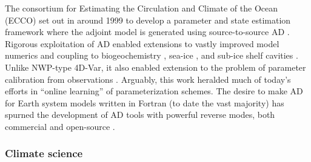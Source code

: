 The consortium for Estimating the Circulation and Climate of the Ocean (ECCO) \cite{Stammer.2002} set out in around 1999 to develop a parameter and state estimation framework
where the adjoint model is generated using source-to-source AD \cite{Marotzke:1999, Heimbach.2005}. 
Rigorous exploitation of AD enabled extensions to vastly improved model numerics \cite{Forget.2015m9i} and coupling to biogeochemistry \cite{Dutkiewicz:2006gw}, sea-ice \cite{Heimbach:2010fz}, and sub-ice shelf cavities \cite{Heimbach:2012iu,Goldberg:2020dl}.
Unlike NWP-type 4D-Var, it also enabled extension to the problem of parameter calibration from observations \cite{Ferreira.2005,Stammer:2005dw,Liu:2012jd}. 
Arguably, this work heralded much of today's efforts in ``online learning'' of parameterization schemes.
The desire to make AD for Earth system models written in Fortran (to date the vast majority) has  spurned the development of AD tools with powerful reverse modes, both commercial \cite{Giering_Kaminski_1998,Giering.2006} and open-source \cite{Utke:2008ko,Hascoet.2013,Gaikwad.2023,Gaikwad.2024}.

\subsubsection{Climate science}

